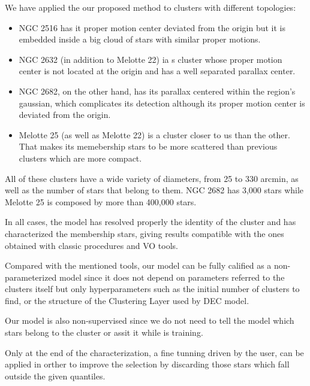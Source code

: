 \documentclass[11pt, a4paper, english]{book}
\begin{document}
We have applied the our proposed method to clusters with different topologies:

\begin{itemize}
  \item NGC 2516 has it proper motion center deviated from the origin but it is embedded inside a big cloud of stars with similar proper motions.
  \item NGC 2632 (in addition to Melotte 22) ia s cluster whose proper motion center is not located at the origin and has a well separated parallax center.
  \item NGC 2682, on the other hand, has its parallax centered within the region's gaussian,
        which complicates its detection although its proper motion center is deviated from the origin.
  \item Melotte 25 (as well as Melotte 22) is a cluster closer to us than the other.
        That makes its memebership stars to be more scattered than previous clusters which are more compact.
\end{itemize}

All of these clusters have a wide variety of diameters, from 25 to 330 arcmin, as well as the number of stars that belong to them.
NGC 2682 has 3,000 stars while Melotte 25 is composed by more than 400,000 stars.



In all cases, the model has resolved properly the identity of the cluster and has characterized the membership stars,
giving results compatible with the ones obtained with classic procedures and VO tools.

Compared with the mentioned tools, our model can be fully calified as a non-parameterized model since it does not depend on parameters referred
to the clusters itself but only hyperparameters such as the initial number of clusters to find, or the structure of the Clustering Layer used by DEC model.

Our model is also non-supervised since we do not need to tell the model which stars belong to the cluster or assit it while is training.

Only at the end of the characterization, a fine tunning driven by the user, can be applied in orther to improve the selection by discarding those
stars which fall outside the given quantiles.
\end{document}
